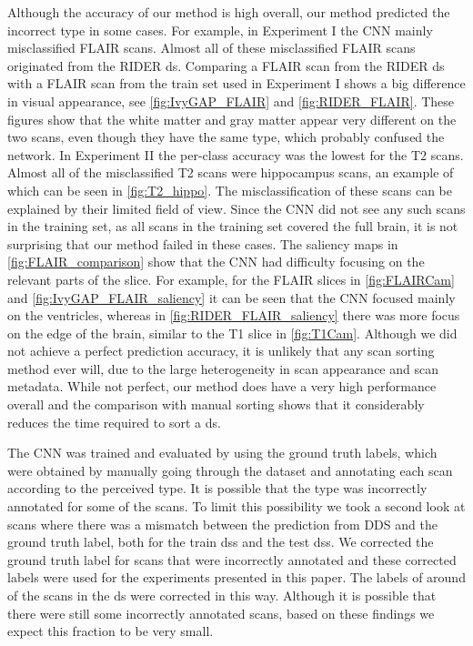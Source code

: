 Although the accuracy of our method is high overall, our method predicted the incorrect \gls{type} in some cases.
For example, in Experiment I the \gls{CNN} mainly misclassified \gls{FLAIR} \glspl{scan}.
Almost all of these misclassified \gls{FLAIR} \glspl{scan} originated from the \gls{RIDER} \gls{ds}.
Comparing a \gls{FLAIR} \gls{scan} from the \gls{RIDER} \gls{ds} with a \gls{FLAIR} \gls{scan} from the train set used in Experiment I shows a  big difference in visual appearance, see \cref{fig:IvyGAP_FLAIR} and \cref{fig:RIDER_FLAIR}.
These figures show that the white matter and gray matter appear very different on the two \glspl{scan}, even though they have the same \gls{type}, which probably confused the network.
In Experiment II the per-class accuracy was the lowest for the \gls{T2} \glspl{scan}.
Almost all of the misclassified \gls{T2} \glspl{scan} were hippocampus \glspl{scan}, an example of which can be seen in \cref{fig:T2_hippo}.
The misclassification of these \glspl{scan} can be explained by their limited field of view.
Since the \gls{CNN} did not see any such \glspl{scan} in the training set, as all \glspl{scan} in the training set covered the full brain, it is not surprising that our method failed in these cases.
The saliency maps in \cref{fig:FLAIR_comparison} show that the \gls{CNN} had difficulty focusing on the relevant parts of the \gls{slice}.
For example, for the \gls{FLAIR} \glspl{slice} in \cref{fig:FLAIRCam} and \cref{fig:IvyGAP_FLAIR_saliency} it can be seen that the \gls{CNN} focused mainly on the ventricles, whereas in \cref{fig:RIDER_FLAIR_saliency} there was more focus on the edge of the brain, similar to the \gls{T1} \gls{slice} in \cref{fig:T1Cam}.
Although we did not achieve a perfect prediction accuracy, it is unlikely that any \gls{scan} sorting method ever will, due to the large heterogeneity in \gls{scan} appearance and \gls{scan} metadata.
While not perfect, our method does have a very high performance overall and the comparison with manual sorting shows that it considerably reduces the time required to sort a \gls{ds}.

The \gls{CNN} was trained and evaluated by using the ground truth labels, which were obtained by manually going through the dataset and annotating each \gls{scan} according to the perceived \gls{type}.
It is possible that the \gls{type} was incorrectly annotated for some of the \glspl{scan}.
To limit this possibility we took a second look at \glspl{scan} where there was a mismatch between the prediction from \gls{DDS} and the ground truth label, both for the train \glspl{ds} and the test \glspl{ds}.
We corrected the ground truth label for \glspl{scan} that were incorrectly annotated and these corrected labels were used for the experiments presented in this paper.
The labels of around  of the \glspl{scan} in the \gls{ds} were corrected in this way.
Although it is possible that there were still some incorrectly annotated \glspl{scan}, based on these findings we expect this fraction to be very small.

